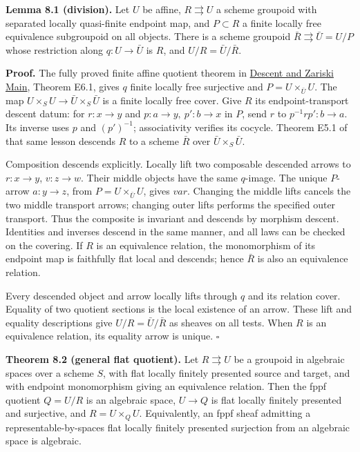 \documentclass[11pt,a4paper,openany]{report}
\begin{document}
\textbf{Lemma 8.1 (division).} Let \(U\) be affine, \(R\rightrightarrows U\) a scheme groupoid with separated locally quasi-finite endpoint map, and \(P\subset R\) a finite locally free equivalence subgroupoid on all objects. There is a scheme groupoid \(\bar R\rightrightarrows\bar U=U/P\) whose restriction along \(q:U\to\bar U\) is \(R\), and \(U/R=\bar U/\bar R\).

\textbf{Proof.} The fully proved finite affine quotient theorem in \href{https://github.com/KokunoYumeto/open-math-courses/blob/main/docs/courses/AG-RG/AG-RG-S04.md}{Descent and Zariski Main}, Theorem E6.1, gives \(q\) finite locally free surjective and \(P=U\times_{\bar U}U\). The map \(U\times_SU\to\bar U\times_S\bar U\) is a finite locally free cover. Give \(R\) its endpoint-transport descent datum: for \(r:x\to y\) and \(p:a\to y,\ p':b\to x\) in \(P\), send \(r\) to \(p^{-1}rp':b\to a\). Its inverse uses \(p\) and \((p')^{-1}\); associativity verifies its cocycle. Theorem E5.1 of that same lesson descends \(R\) to a scheme \(\bar R\) over \(\bar U\times_S\bar U\).

Composition descends explicitly. Locally lift two composable descended arrows to \(r:x\to y\), \(v:z\to w\). Their middle objects have the same \(q\)-image. The unique \(P\)-arrow \(a:y\to z\), from \(P=U\times_{\bar U}U\), gives \(var\). Changing the middle lifts cancels the two middle transport arrows; changing outer lifts performs the specified outer transport. Thus the composite is invariant and descends by morphism descent. Identities and inverses descend in the same manner, and all laws can be checked on the covering. If \(R\) is an equivalence relation, the monomorphism of its endpoint map is faithfully flat local and descends; hence \(\bar R\) is also an equivalence relation.

Every descended object and arrow locally lifts through \(q\) and its relation cover. Equality of two quotient sections is the local existence of an arrow. These lift and equality descriptions give \(U/R=\bar U/\bar R\) as sheaves on all tests. When \(R\) is an equivalence relation, its equality arrow is unique. \(\square\)

\textbf{Theorem 8.2 (general flat quotient).} Let \(R\rightrightarrows U\) be a groupoid in algebraic spaces over a scheme \(S\), with flat locally finitely presented source and target, and with endpoint monomorphism giving an equivalence relation. Then the fppf quotient \(Q=U/R\) is an algebraic space, \(U\to Q\) is flat locally finitely presented and surjective, and \(R=U\times_Q U\). Equivalently, an fppf sheaf admitting a representable-by-spaces flat locally finitely presented surjection from an algebraic space is algebraic.
\end{document}
